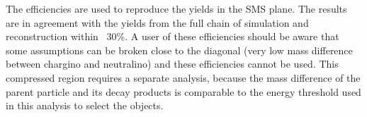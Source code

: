 The efficiencies are used to reproduce the yields in the SMS plane. The results are in agreement with the yields from the full chain of 
simulation and reconstruction within ~30\%.
A user of these efficiencies should be aware that some assumptions can be
broken close to the diagonal (very low mass difference between chargino and neutralino) and these efficiencies cannot be used. 
This compressed region requires a separate analysis, 
because the mass difference of the parent particle and its decay products is comparable 
to the energy threshold used in this analysis to select the objects.
